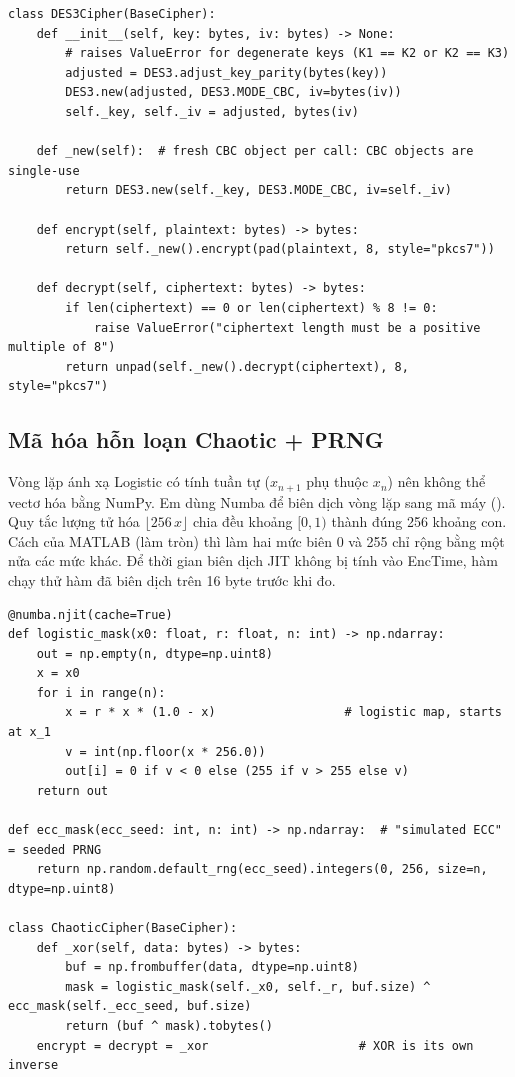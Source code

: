 \begin{lstlisting}[caption={Lớp mã hóa 3DES-CBC (\code{crypto/des3\_cipher.py}, rút gọn)}, label={lst:des3}]
class DES3Cipher(BaseCipher):
    def __init__(self, key: bytes, iv: bytes) -> None:
        # raises ValueError for degenerate keys (K1 == K2 or K2 == K3)
        adjusted = DES3.adjust_key_parity(bytes(key))
        DES3.new(adjusted, DES3.MODE_CBC, iv=bytes(iv))
        self._key, self._iv = adjusted, bytes(iv)

    def _new(self):  # fresh CBC object per call: CBC objects are single-use
        return DES3.new(self._key, DES3.MODE_CBC, iv=self._iv)

    def encrypt(self, plaintext: bytes) -> bytes:
        return self._new().encrypt(pad(plaintext, 8, style="pkcs7"))

    def decrypt(self, ciphertext: bytes) -> bytes:
        if len(ciphertext) == 0 or len(ciphertext) % 8 != 0:
            raise ValueError("ciphertext length must be a positive multiple of 8")
        return unpad(self._new().decrypt(ciphertext), 8, style="pkcs7")
\end{lstlisting}

\subsection{Mã hóa hỗn loạn Chaotic + PRNG}

Vòng lặp ánh xạ Logistic có tính tuần tự ($x_{n+1}$ phụ thuộc $x_n$) nên không thể vectơ hóa bằng
NumPy. Em dùng Numba \cite{lam2015numba} để biên dịch vòng lặp sang mã máy ().
Quy tắc lượng tử hóa $\lfloor 256\,x \rfloor$ chia đều khoảng $[0,1)$ thành đúng 256 khoảng con.
Cách  của MATLAB (làm tròn) thì làm hai mức biên 0 và 255 chỉ rộng bằng một nửa
các mức khác. Để thời gian biên dịch JIT không bị tính vào EncTime, hàm  chạy thử
hàm đã biên dịch trên 16 byte trước khi đo.

\begin{lstlisting}[caption={Sinh mặt nạ hỗn loạn và mã hóa XOR (\code{crypto/chaotic\_cipher.py}, rút gọn)}, label={lst:chaotic}]
@numba.njit(cache=True)
def logistic_mask(x0: float, r: float, n: int) -> np.ndarray:
    out = np.empty(n, dtype=np.uint8)
    x = x0
    for i in range(n):
        x = r * x * (1.0 - x)                  # logistic map, starts at x_1
        v = int(np.floor(x * 256.0))
        out[i] = 0 if v < 0 else (255 if v > 255 else v)
    return out

def ecc_mask(ecc_seed: int, n: int) -> np.ndarray:  # "simulated ECC" = seeded PRNG
    return np.random.default_rng(ecc_seed).integers(0, 256, size=n, dtype=np.uint8)

class ChaoticCipher(BaseCipher):
    def _xor(self, data: bytes) -> bytes:
        buf = np.frombuffer(data, dtype=np.uint8)
        mask = logistic_mask(self._x0, self._r, buf.size) ^ ecc_mask(self._ecc_seed, buf.size)
        return (buf ^ mask).tobytes()
    encrypt = decrypt = _xor                     # XOR is its own inverse
\end{lstlisting}

